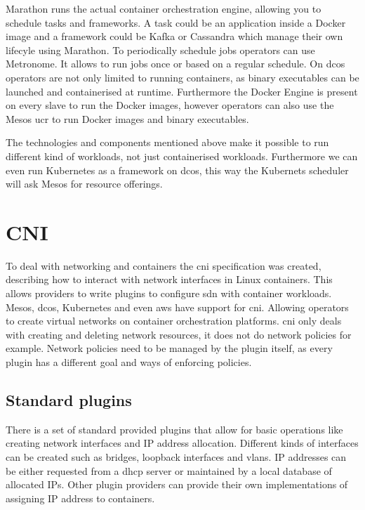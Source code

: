 Marathon\cite{marathon} runs the actual container orchestration engine, allowing you to schedule tasks and frameworks. A task could be an application inside a Docker image and a framework could be Kafka\cite{kafka} or Cassandra\cite{cassandra} which manage their own lifecyle using Marathon. To periodically schedule jobs operators can use Metronome\cite{metronome}. It allows to run jobs once or based on a regular schedule. On \gls{dcos} operators are not only limited to running containers, as binary executables can be launched and containerised at runtime. Furthermore the Docker Engine is present on every slave to run the Docker images, however operators can also use the Mesos \gls{ucr}\cite{ucr} to run Docker images and binary executables.

The technologies and components mentioned above make it possible to run different kind of workloads, not just containerised workloads. Furthermore we can even run Kubernetes as a framework on \gls{dcos}, this way the Kubernets scheduler will ask Mesos for resource offerings.

\section{CNI}
To deal with networking and containers the \gls{cni} specification was created, describing how to interact with network interfaces in Linux containers. This allows providers to write plugins to configure \gls{sdn} with container workloads. Mesos, \gls{dcos}, Kubernetes and even \gls{aws} have support for \gls{cni}. Allowing operators to create virtual networks on container orchestration platforms.
\Gls{cni} only deals with creating and deleting network resources, it does not do network policies for example. Network policies need to be managed by the plugin itself, as every plugin has a different goal and ways of enforcing policies.

\subsection{Standard plugins}
There is a set of standard provided plugins\cite{cni_plugin} that allow for basic operations like creating network interfaces and IP address allocation. Different kinds of interfaces can be created such as bridges, loopback interfaces and \glspl{vlan}. IP addresses can be either requested from a \gls{dhcp} server or maintained by a local database of allocated IPs. Other plugin providers can provide their own implementations of assigning IP address to containers.


